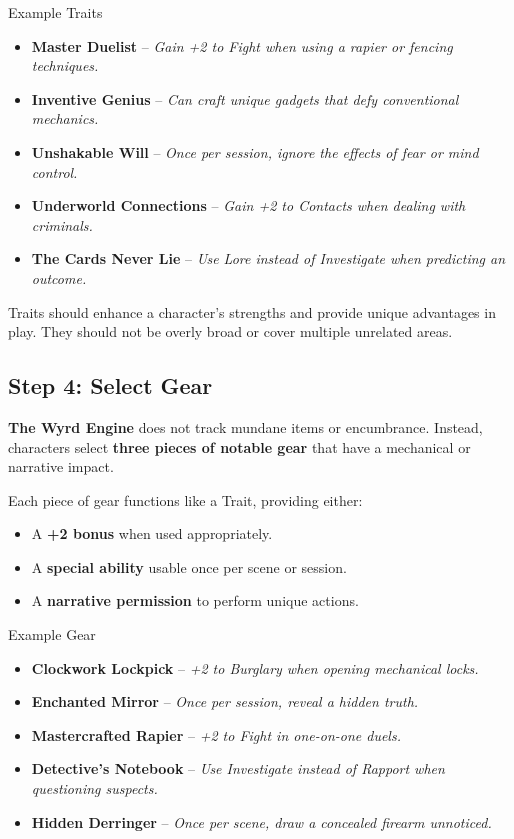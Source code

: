 \begin{DndSidebar}[float=!b]{Example Traits}
    \begin{itemize}
        \item \textbf{Master Duelist} – \emph{Gain +2 to Fight when using a rapier or fencing techniques.}
        \item \textbf{Inventive Genius} – \emph{Can craft unique gadgets that defy conventional mechanics.}
        \item \textbf{Unshakable Will} – \emph{Once per session, ignore the effects of fear or mind control.}
        \item \textbf{Underworld Connections} – \emph{Gain +2 to Contacts when dealing with criminals.}
        \item \textbf{The Cards Never Lie} – \emph{Use Lore instead of Investigate when predicting an outcome.}
    \end{itemize}
\end{DndSidebar}

Traits should enhance a character’s strengths and provide unique advantages in play. They should not be overly broad or cover multiple unrelated areas.

\subsection{Step 4: Select Gear}

\textbf{The Wyrd Engine} does not track mundane items or encumbrance. Instead, characters select \textbf{three pieces of notable gear} that have a mechanical or narrative impact.

Each piece of gear functions like a Trait, providing either:
\begin{itemize}
    \item A \textbf{+2 bonus} when used appropriately.
    \item A \textbf{special ability} usable once per scene or session.
    \item A \textbf{narrative permission} to perform unique actions.
\end{itemize}

\begin{DndSidebar}[float=!t]{Example Gear}
    \begin{itemize}
        \item \textbf{Clockwork Lockpick} – \emph{+2 to Burglary when opening mechanical locks.}
        \item \textbf{Enchanted Mirror} – \emph{Once per session, reveal a hidden truth.}
        \item \textbf{Mastercrafted Rapier} – \emph{+2 to Fight in one-on-one duels.}
        \item \textbf{Detective’s Notebook} – \emph{Use Investigate instead of Rapport when questioning suspects.}
        \item \textbf{Hidden Derringer} – \emph{Once per scene, draw a concealed firearm unnoticed.}
    \end{itemize}
\end{DndSidebar}

